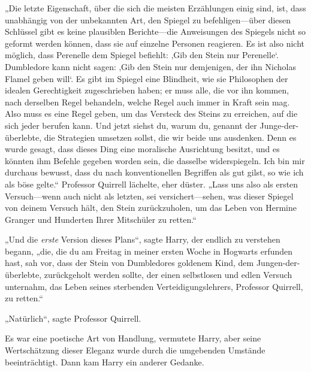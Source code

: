 „Die letzte Eigenschaft, über die sich die meisten Erzählungen einig sind, ist, dass unabhängig von der unbekannten Art, den Spiegel zu befehligen—über diesen Schlüssel gibt es keine plausiblen Berichte—die Anweisungen des Spiegels nicht so geformt werden können, dass sie auf einzelne Personen reagieren. Es ist also nicht möglich, dass Perenelle dem Spiegel befiehlt: ‚Gib den Stein nur Perenelle‘. Dumbledore kann nicht sagen: ‚Gib den Stein nur demjenigen, der ihn Nicholas Flamel geben will‘. Es gibt im Spiegel eine Blindheit, wie sie Philosophen der idealen Gerechtigkeit zugeschrieben haben; er muss alle, die vor ihn kommen, nach derselben Regel behandeln, welche Regel auch immer in Kraft sein mag. Also muss es eine Regel geben, um das Versteck des Steins zu erreichen, auf die sich jeder berufen kann. Und jetzt siehst du, warum du, genannt der Junge-der-überlebte, die Strategien umsetzen sollst, die wir beide uns ausdenken. Denn es wurde gesagt, dass dieses Ding eine moralische Ausrichtung besitzt, und es könnten ihm Befehle gegeben worden sein, die dasselbe widerspiegeln. Ich bin mir durchaus bewusst, dass du nach konventionellen Begriffen als gut gilst, so wie ich als böse gelte.“ Professor Quirrell lächelte, eher düster. „Lass uns also als ersten Versuch—wenn auch nicht als letzten, sei versichert—sehen, was dieser Spiegel von deinem Versuch hält, den Stein zurückzuholen, um das Leben von Hermine Granger und Hunderten Ihrer Mitschüler zu retten.“

„Und die \emph{erste} Version dieses Plans“, sagte Harry, der endlich zu verstehen begann, „die, die du am Freitag in meiner ersten Woche in Hogwarts erfunden hast, sah vor, dass der Stein von Dumbledores goldenem Kind, dem Jungen-der-überlebte, zurückgeholt werden sollte, der einen selbstlosen und edlen Versuch unternahm, das Leben seines sterbenden Verteidigungslehrers, Professor Quirrell, zu retten.“

„Natürlich“, sagte Professor Quirrell.

Es war eine poetische Art von Handlung, vermutete Harry, aber seine Wertschätzung dieser Eleganz wurde durch die umgebenden Umstände beeinträchtigt.
Dann kam Harry ein anderer Gedanke.


